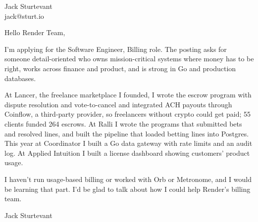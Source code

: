 \documentclass[11pt]{article}
\begin{document}
\raggedright

{\namefont\fontsize{20pt}{24pt}\selectfont Jack Sturtevant}\\[-0.3em]
jack@sturt.io

\vspace{1.2em}

Hello Render Team,

I'm applying for the Software Engineer, Billing role. The posting asks for someone detail-oriented who owns mission-critical systems where money has to be right, works across finance and product, and is strong in Go and production databases.

At Lancer, the freelance marketplace I founded, I wrote the escrow program with dispute resolution and vote-to-cancel and integrated ACH payouts through Coinflow, a third-party provider, so freelancers without crypto could get paid; 55 clients funded 264 escrows. At Ralli I wrote the programs that submitted bets and resolved lines, and built the pipeline that loaded betting lines into Postgres. This year at Coordinator I built a Go data gateway with rate limits and an audit log. At Applied Intuition I built a license dashboard showing customers' product usage.

I haven't run usage-based billing or worked with Orb or Metronome, and I would be learning that part. I'd be glad to talk about how I could help Render's billing team.

\vspace{0.6em}
Jack Sturtevant
\end{document}
